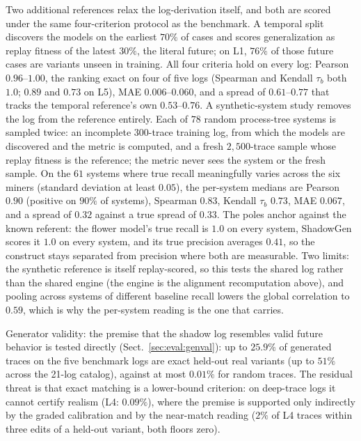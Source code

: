 \documentclass[runningheads]{llncs}
\newcommand{\chg}[1]{#1}
\begin{document}
\chg{Two additional references relax the log-derivation itself, and both are scored under the same four-criterion protocol as the benchmark. A temporal split discovers the models on the earliest $70\%$ of cases and scores generalization as replay fitness of the latest $30\%$, the literal future; on L1, $76\%$ of those future cases are variants unseen in training. All four criteria hold on every log: Pearson $0.96$--$1.00$, the ranking exact on four of five logs (Spearman and Kendall $\tau_b$ both $1.0$; $0.89$ and $0.73$ on L5), MAE $0.006$--$0.060$, and a spread of $0.61$--$0.77$ that tracks the temporal reference's own $0.53$--$0.76$. A synthetic-system study removes the log from the reference entirely. Each of $78$ random process-tree systems is sampled twice: an incomplete $300$-trace training log, from which the models are discovered and the metric is computed, and a fresh $2{,}500$-trace sample whose replay fitness is the reference; the metric never sees the system or the fresh sample. On the $61$ systems where true recall meaningfully varies across the six miners (standard deviation at least $0.05$), the per-system medians are Pearson $0.90$ (positive on $90\%$ of systems), Spearman $0.83$, Kendall $\tau_b$ $0.73$, MAE $0.067$, and a spread of $0.32$ against a true spread of $0.33$. The poles anchor against the known referent: the flower model's true recall is $1.0$ on every system, ShadowGen scores it $1.0$ on every system, and its true precision averages $0.41$, so the construct stays separated from precision where both are measurable. Two limits: the synthetic reference is itself replay-scored, so this tests the shared log rather than the shared engine (the engine is the alignment recomputation above), and pooling across systems of different baseline recall lowers the global correlation to $0.59$, which is why the per-system reading is the one that carries.}

\chg{Generator validity: the premise that the shadow log resembles valid future behavior is tested directly (Sect.~\ref{sec:eval:genval}): up to $25.9\%$ of generated traces on the five benchmark logs are exact held-out real variants (up to $51\%$ across the 21-log catalog), against at most $0.01\%$ for random traces. The residual threat is that exact matching is a lower-bound criterion: on deep-trace logs it cannot certify realism (L4: $0.09\%$), where the premise is supported only indirectly by the graded calibration and by the near-match reading ($2\%$ of L4 traces within three edits of a held-out variant, both floors zero).}
\end{document}
